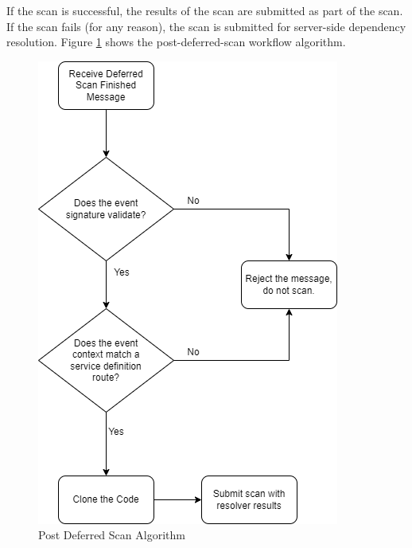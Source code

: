 If the \scaresolver scan is successful, the results of the 
scan are submitted as part of the \cxone scan.  If the \scaresolver scan fails (for any reason), the \cxone scan is submitted for server-side dependency resolution.
Figure \ref{fig:post-deferred-scan-flowchart} shows the post-deferred-scan workflow algorithm.

\begin{figure}[ht]
  \includegraphics[width=\textwidth]{graphics/cxoneflow-diagrams-Post Deferred Scan Algorithm.png}
  \caption{Post Deferred Scan Algorithm}
  \label{fig:post-deferred-scan-flowchart}
\end{figure}



